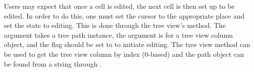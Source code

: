 Users may expect that once a cell is edited, the next cell is then set
up to be edited. In order to do this, one must set the cursor to the
appropriate place and set the state to editing. This is done through
the tree view's  method. The
 argument takes a tree path instance, the 
argument is for a tree view column object, and the flag
 should be set to  to initiate
editing. The tree view method  can be
used to get the tree view column by index ($0$-based) and the path
object can be found from a string through .



